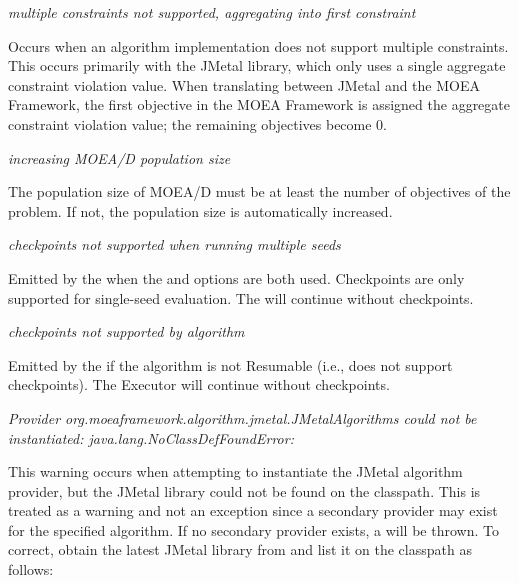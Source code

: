\noindent
\textit{multiple constraints not supported, aggregating into first constraint}
\begin{indented}
  Occurs when an algorithm implementation does not support multiple constraints. This occurs primarily with the JMetal library, which only uses a single aggregate constraint violation value.  When translating between JMetal and the MOEA Framework, the first objective in the MOEA Framework is assigned the aggregate constraint violation value; the remaining objectives become 0.
\end{indented}

\noindent
\textit{increasing MOEA/D population size}
\begin{indented}
  The population size of MOEA/D must be at least the number of objectives of the problem.  If not, the population size is automatically increased.
\end{indented}
  
\noindent
\textit{checkpoints not supported when running multiple seeds}
\begin{indented}
  Emitted by the  when the  and  options are both used.  Checkpoints are only supported for single-seed evaluation.  The  will continue without checkpoints.
\end{indented}
  
\noindent
\textit{checkpoints not supported by algorithm}
\begin{indented}
  Emitted by the  if the algorithm is not Resumable (i.e., does not support checkpoints).  The Executor will continue without checkpoints.
\end{indented}
  
\noindent
\textit{Provider org.moeaframework.algorithm.jmetal.JMetalAlgorithms could not be instantiated: java.lang.NoClassDefFoundError: }
\begin{indented}
  This warning occurs when attempting to instantiate the JMetal algorithm provider, but the JMetal library could not be found on the classpath.  This is treated as a warning and not an exception since a secondary provider may exist for the specified algorithm.  If no secondary provider exists, a  will be thrown.  To correct, obtain the latest JMetal library from  and list it on the  classpath as follows:
  \begin{indented}
  \end{indented}
\end{indented}
    
